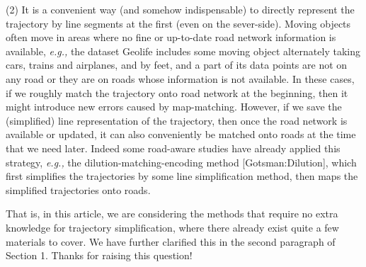 \documentclass{letter}
\newcommand{\eg}{\emph{e.g.,}\xspace}
\begin{document}
(2) It is a convenient way (and somehow indispensable) to directly represent the trajectory by line segments at the first (even on the sever-side). Moving objects often move in areas where no fine or up-to-date road network information is available, \eg the dataset Geolife includes some moving object alternately taking cars, trains and airplanes, and by feet, and a part of its data points are not on any road or they are on roads whose information is not available. In these cases, if we roughly match the trajectory onto road network at the beginning, then it might introduce new errors caused by map-matching. However, if we save the (simplified) line representation of the trajectory, then once the road network is available or updated, it can also conveniently be matched onto roads at the time that we need later. Indeed some road-aware studies have already applied this strategy, \eg the dilution-matching-encoding  method [Gotsman:Dilution], which first simplifies the trajectories by some line simplification method, then maps the simplified trajectories onto roads.


That is, in this article, we are considering the methods that require no extra knowledge for trajectory simplification, where there already exist quite a few materials to cover. We have further clarified this in the second paragraph of Section 1. Thanks for raising this question!

\end{document}
